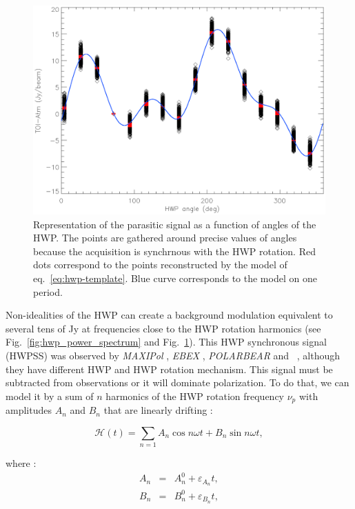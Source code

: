 \begin{figure}[h]
\center
\includegraphics[clip, angle=0, width=\columnwidth]{Figures/hwpss_2pi.eps}
\caption{Representation of the parasitic signal as a function of angles of the HWP. The points are gathered around precise values of angles because the acquisition is synchrnous with the HWP rotation. Red dots correspond to the points reconstructed by the model of eq.~\ref{eq:hwp-template}. Blue curve corresponds to the model on one period.}
\label{fig:hwpss_2pi}
\end{figure}

Non-idealities of the HWP can create a background modulation equivalent to several tens of Jy at frequencies close to the HWP rotation harmonics \citep{2017A&A...599A..34R} (see Fig.~\ref{fig:hwp_power_spectrum} and Fig.~\ref{fig:hwpss_2pi}). This HWP synchronous signal (HWPSS) was observed by \emph{MAXIPol} \citep{2007ApJ...665...42J}, \emph{EBEX} \citep{2010SPIE.7741E..1CR}, \emph{POLARBEAR} \citep{2017JCAP...05..008T} and \nika\ \citep{2017A&A...599A..34R}, although they have different HWP and HWP rotation mechanism. This signal must be subtracted from observations or it will dominate polarization. To do that, we can model it by a sum of $n$ harmonics of the HWP rotation frequency $\nu_{p}$ with amplitudes $A_{n}$ and $B_{n}$ that are linearly drifting :

\begin{equation}
\mathcal{H}(t) = \sum_{n=1} A_{n} \cos n\omega t + B_{n} \sin n \omega t , 
\label{eq:hwp-template}
\end{equation}

where : 
\begin{eqnarray}
A_{n}  &=& A_{n}^{0} + \varepsilon_{A_{n}}t,\\
B_{n}  &=& B_{n}^{0} + \varepsilon_{B_{n}}t, 
\end{eqnarray}

